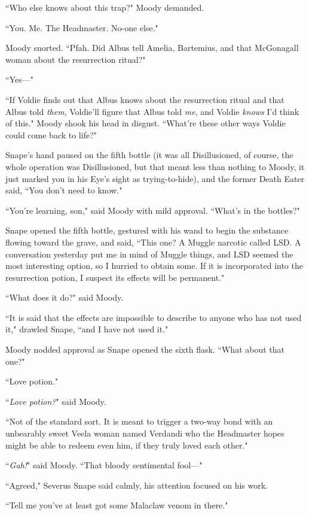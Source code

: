 ``Who else knows about this trap?" Moody demanded.

``You. Me. The Headmaster. No-one else."

Moody snorted. ``Pfah. Did Albus tell Amelia, Bartemius, and that McGonagall woman about the resurrection ritual?"

``Yes—"

``If Voldie finds out that Albus knows about the resurrection ritual and that Albus told \emph{them}, Voldie'll figure that Albus told \emph{me}, and Voldie \emph{knows} I'd think of this." Moody shook his head in disgust. ``What're these other ways Voldie could come back to life?"

Snape's hand paused on the fifth bottle (it was all Disillusioned, of course, the whole operation was Disillusioned, but that meant less than nothing to Moody, it just marked you in his Eye's sight as trying-to-hide), and the former Death Eater said, ``You don't need to know."

``You're learning, son," said Moody with mild approval. ``What's in the bottles?"

Snape opened the fifth bottle, gestured with his wand to begin the substance flowing toward the grave, and said, ``This one? A Muggle narcotic called LSD. A conversation yesterday put me in mind of Muggle things, and LSD seemed the most interesting option, so I hurried to obtain some. If it is incorporated into the resurrection potion, I suspect its effects will be permanent."

``What does it do?" said Moody.

``It is said that the effects are impossible to describe to anyone who has not used it," drawled Snape, ``and I have not used it."

Moody nodded approval as Snape opened the sixth flask. ``What about that one?"

``Love potion."

``\emph{Love potion?}" said Moody.

``Not of the standard sort. It is meant to trigger a two-way bond with an unbearably sweet Veela woman named Verdandi who the Headmaster hopes might be able to redeem even him, if they truly loved each other."

``\emph{Gah!}" said Moody. ``That bloody sentimental fool—"

``Agreed," Severus Snape said calmly, his attention focused on his work.

``Tell me you've at least got some Malaclaw venom in there."

